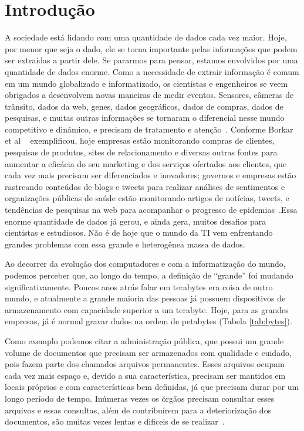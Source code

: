 \chapter{Introdução}
A sociedade está lidando com uma quantidade de dados cada vez maior. Hoje, por menor que seja o dado, ele se torna importante pelas informações que podem ser extraídas a partir dele. Se pararmos para pensar, estamos envolvidos por uma quantidade de dados enorme. Como a necessidade de extrair informação é comum em um mundo globalizado e informatizado,  os cientistas e engenheiros se veem obrigados a desenvolvem novas maneiras de medir eventos. Sensores, câmeras de trânsito, dados da web, genes, dados geográficos, dados de compras, dados de pesquisas, e muitas outras informações se tornaram o diferencial nesse mundo competitivo e dinâmico, e precisam de tratamento e atenção~\cite{initBigData}. Conforme Borkar et al ~\cite{WNextBigData} exemplificou, hoje empresas estão monitorando compras de clientes, pesquisas de produtos, sites de relacionamento e diversas outras fontes para aumentar a eficácia do seu marketing e dos serviços ofertados aos clientes, que cada vez mais precisam ser diferenciados e inovadores; governos e empresas estão rastreando conteúdos de blogs e tweets para realizar análises de sentimentos e organizações públicas de saúde estão monitorando artigos de notícias, tweets, e tendências de pesquisas na web para acompanhar o progresso de epidemias~\cite{WNextBigData}.Essa enorme quantidade de dados já gerou, e ainda gera, muitos desafios para cientistas e estudiosos. Não é de hoje que o mundo da TI vem enfrentando grandes problemas com essa grande e heterogênea massa de dados.

Ao decorrer da evolução dos computadores e com a informatização do mundo, podemos perceber que, ao longo do tempo, a definição de “grande” foi mudando significativamente. Poucos anos atrás falar em terabytes era coisa de outro mundo, e atualmente a grande maioria das pessoas já possuem dispositivos de armazenamento com capacidade superior a um terabyte. Hoje, para as grandes empresas, já é normal gravar dados na ordem de petabytes (Tabela \ref{tab:bytes}).

Como exemplo podemos citar a administração pública, que possui um grande volume de documentos que precisam ser armazenados com qualidade e cuidado, pois fazem parte dos chamados arquivos permanentes. Esses arquivos ocupam cada vez mais espaço e, devido a sua característica, precisam ser mantidos em locais próprios e com características bem definidas, já que precisam durar por um longo período de tempo. Inúmeras vezes os órgãos precisam consultar esses arquivos e essas consultas, além de contribuírem para a deteriorização dos documentos, são muitas vezes lentas e dificeis de se realizar~\cite{arqConarq}.

